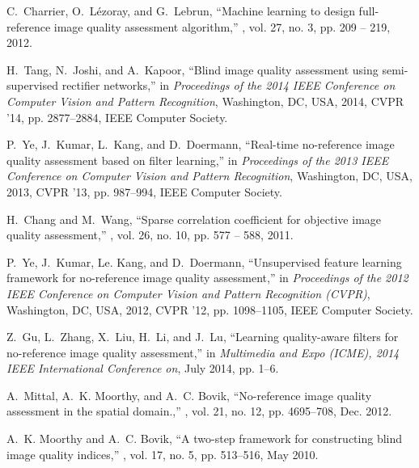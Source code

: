 \documentclass[draftcls,12pt, onecolumn]{IEEEtran}
\begin{document}
\begin{thebibliography}{10}

C.~Charrier, O.~Lézoray, and G.~Lebrun,
\newblock ``Machine learning to design full-reference image quality assessment
  algorithm,''
, vol. 27, no. 3, pp. 209
  -- 219, 2012.

H.~Tang, N.~Joshi, and A.~Kapoor,
\newblock ``Blind image quality assessment using semi-supervised rectifier
  networks,''
\newblock in {\em Proceedings of the 2014 IEEE Conference on Computer Vision
  and Pattern Recognition}, Washington, DC, USA, 2014, CVPR '14, pp.
  2877--2884, IEEE Computer Society.

P.~Ye, J.~Kumar, L.~Kang, and D.~Doermann,
\newblock ``Real-time no-reference image quality assessment based on filter
  learning,''
\newblock in {\em Proceedings of the 2013 IEEE Conference on Computer Vision
  and Pattern Recognition}, Washington, DC, USA, 2013, CVPR '13, pp. 987--994,
  IEEE Computer Society.

H.~Chang and M.~Wang,
\newblock ``Sparse correlation coefficient for objective image quality
  assessment,''
, vol. 26, no. 10, pp.
  577 -- 588, 2011.

P.~Ye, J.~Kumar, Le. Kang, and D.~Doermann,
\newblock ``Unsupervised feature learning framework for no-reference image
  quality assessment,''
\newblock in {\em Proceedings of the 2012 IEEE Conference on Computer Vision
  and Pattern Recognition (CVPR)}, Washington, DC, USA, 2012, CVPR '12, pp.
  1098--1105, IEEE Computer Society.

Z.~Gu, L.~Zhang, X.~Liu, H.~Li, and J.~Lu,
\newblock ``Learning quality-aware filters for no-reference image quality
  assessment,''
\newblock in {\em Multimedia and Expo (ICME), 2014 IEEE International
  Conference on}, July 2014, pp. 1--6.

A.~Mittal, A.~K. Moorthy, and A.~C. Bovik,
\newblock ``{No-reference image quality assessment in the spatial domain.},''
, vol. 21, no. 12, pp.
  4695--708, Dec. 2012.

A.~K. Moorthy and A.~C. Bovik,
\newblock ``A two-step framework for constructing blind image quality
  indices,''
, vol. 17, no. 5, pp. 513--516,
  May 2010.


\end{thebibliography}
\end{document}
